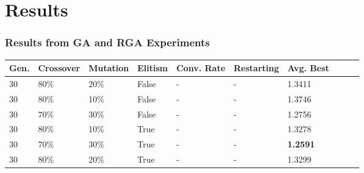 \documentclass[10pt]{beamer}
\begin{document}
\section{Results}

\begin{frame}
	\frametitle{Results from GA and RGA Experiments}


	\begin{table}
	  \begin{tabular}{ | l | l | l | l | l | l | l | l | l | l | }
	    \hline
	    Gen. & Crossover & Mutation & Elitism & Conv. Rate & Restarting &  Avg. Best \\ \hline \hline
	    30 & 80\% & 20\% & False & - & - & 1.3411 \\ \hline
	    30 & 80\% & 10\% & False & - & - & 1.3746 \\ \hline
	    30 & 70\% & 30\% & False & - & - & 1.2756 \\ \hline
	    30 & 80\% & 10\% & True & - & - & 1.3278 \\ \hline
	    30 & 70\% & 30\% & True & - & - & \textbf{1.2591} \\ \hline
	    30 & 80\% & 20\% & True & - & - & 1.3299 \\ \hline
	  \end{tabular}
	\end{table}


\end{frame}
\end{document}
